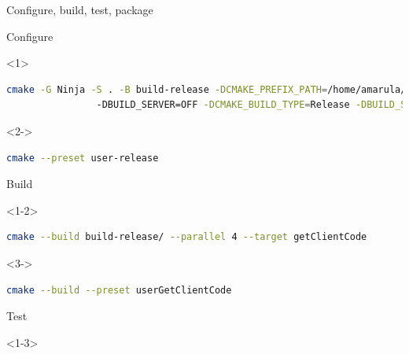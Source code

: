 \documentclass{beamer}
\begin{document}

\begin{frame}[fragile]{Configure, build, test, package}\footnotesize%
	\vspace{1.0cm}
 	\begin{block}{\footnotesize Configure}
		\begin{onlyenv}<1>
			\begin{lstlisting}[language=sh]
				cmake -G Ninja -S . -B build-release -DCMAKE_PREFIX_PATH=/home/amarula/Qt/6.8.0/gcc_64/
				-DBUILD_SERVER=OFF -DCMAKE_BUILD_TYPE=Release -DBUILD_SHARED_LIBS=ON
			\end{lstlisting}
		\end{onlyenv}
		\begin{onlyenv}<2->
			\begin{lstlisting}[language=sh]
				cmake --preset user-release
			\end{lstlisting}
		\end{onlyenv}
	\end{block}
	\begin{block}{\footnotesize Build}
		\begin{onlyenv}
			\begin{lstlisting}[language=sh]
				cmake --build build-release/ --parallel 4 --target getClientCode
			\end{lstlisting}
		\end{onlyenv}
		\begin{onlyenv}<3->
			\begin{lstlisting}[language=sh]
				cmake --build --preset userGetClientCode
			\end{lstlisting}
		\end{onlyenv}
	\end{block}
	\begin{block}{\footnotesize Test}
		\begin{onlyenv}
			\begin{lstlisting}[language=sh]

\end{lstlisting}
\end{onlyenv}
\end{block}
\end{frame}
\end{document}
